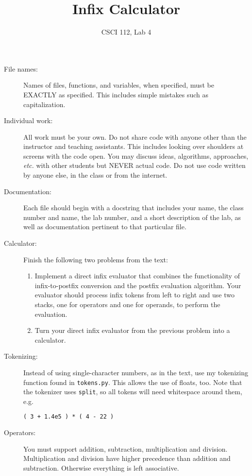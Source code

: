 \documentclass{article}
\title{Infix Calculator}
\author{CSCI 112, Lab 4}
\date{}
\begin{document}
\sloppy

\maketitle

\begin{description} 
\item[File names:]  Names of files, functions, and variables, 
when specified,
must be EXACTLY as specified.  This includes simple mistakes such
as capitalization.

\item[Individual work:]  All work must be your own.  Do not share
code with anyone other than the instructor and teaching assistants.
This includes looking over shoulders at screens with the code open.
You may discuss ideas, algorithms, approaches, {\em etc.} with
other students but NEVER actual code.  Do not use code
written by anyone else, in the class or from the internet.

\item[Documentation:] Each file should begin with a docstring
that includes your name, the class number and name, the lab
number, and  
a short description of the lab, as well as documentation pertinent
to that particular file.

\item[Calculator:] Finish the following two problems from the text:
\begin{enumerate}
\item
Implement a direct infix evaluator that combines the functionality of infix-to-postfix conversion and the postfix evaluation algorithm. Your evaluator should process infix tokens from left to right and use two stacks, one for operators and one for operands, to perform the evaluation.
\item
Turn your direct infix evaluator from the previous problem into a calculator.
\end{enumerate}

\item[Tokenizing:]  Instead of using single-character numbers, as in the text,
use my tokenizing function found in \lstinline{tokens.py}.  This allows the use
of floats, too.  Note that the tokenizer uses \lstinline{split}, so all tokens will need
whitespace around them, e.g.
\begin{lstlisting}
( 3 + 1.4e5 ) * ( 4 - 22 )
\end{lstlisting}

\item[Operators:] You must support addition, subtraction, multiplication
and division.  Multiplication and division have higher precedence than 
addition and subtraction.  Otherwise everything is left associative.


\end{description}
\end{document}
